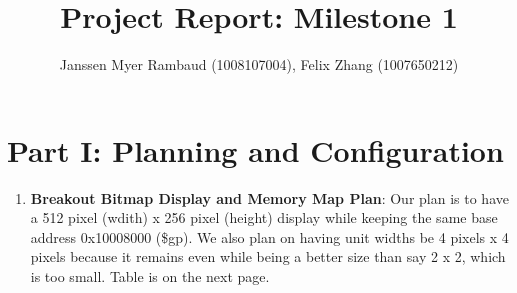 \documentclass{article}
\title{Project Report: Milestone 1}
\author{Janssen Myer Rambaud (1008107004), Felix Zhang (1007650212)}
\begin{document}
\maketitle

\section{Part I: Planning and Configuration}

\begin{enumerate}
\item \textbf{Breakout Bitmap Display and Memory Map Plan}: 
Our plan is to have a 512 pixel (wdith) x 256 pixel (height) display while keeping the same base address 0x10008000 (\$gp). We also plan on having unit widths be 4 pixels x 4 pixels because it remains even while being a better size than say 2 x 2, which is too small. Table is on the next page.


\end{enumerate}
\end{document}
